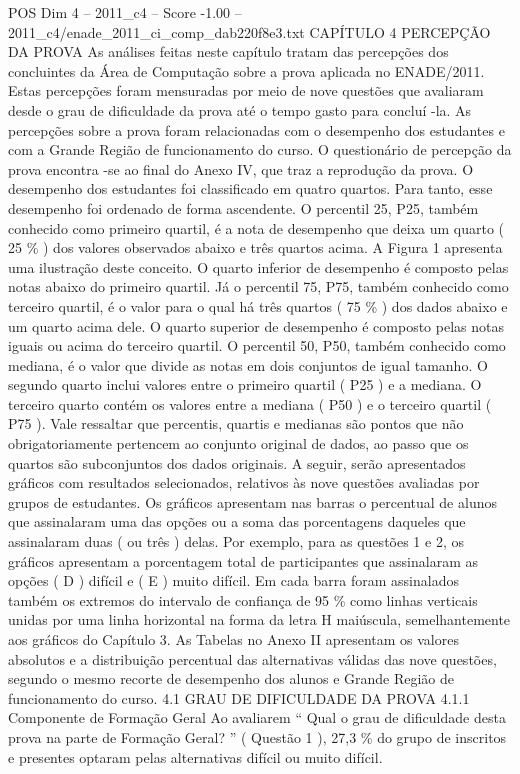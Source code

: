 \begin{textsample}{POS Dim 4 – 2011\_c4 – Score -1.00 – 2011\_c4/enade\_2011\_ci\_comp\_dab220f8e3.txt}  \label{ex:f4_pos_237}
CAPÍTULO 4 PERCEPÇÃO DA PROVA As análises feitas neste capítulo tratam das percepções dos concluintes da Área de Computação sobre a prova aplicada no ENADE/2011.
Estas percepções foram mensuradas por meio de nove questões que avaliaram desde o grau de dificuldade da prova até o tempo gasto para concluí -la.
As percepções sobre a prova foram relacionadas com o desempenho dos estudantes e com a Grande Região de funcionamento do curso.
O questionário de percepção da prova encontra -se ao final do Anexo IV, que traz a reprodução da prova.
O desempenho dos estudantes foi classificado em quatro quartos.
Para tanto, esse desempenho foi ordenado de forma ascendente.
O percentil 25, P25, também conhecido como primeiro quartil, é a nota de desempenho que deixa um quarto ( 25 \% ) dos valores observados abaixo e três quartos acima.
A Figura 1 apresenta uma ilustração deste conceito.
O quarto inferior de desempenho é composto pelas notas abaixo do primeiro quartil.
Já o percentil 75, P75, também conhecido como terceiro quartil, é o valor para o qual há três quartos ( 75 \% ) dos dados abaixo e um quarto acima dele.
O quarto superior de desempenho é composto pelas notas iguais ou acima do terceiro quartil.
O percentil 50, P50, também conhecido como mediana, é o valor que divide as notas em dois conjuntos de igual tamanho.
O segundo quarto inclui valores entre o primeiro quartil ( P25 ) e a mediana.
O terceiro quarto contém os valores entre a mediana ( P50 ) e o terceiro quartil ( P75 ).
Vale ressaltar que percentis, quartis e medianas são pontos que não obrigatoriamente pertencem ao conjunto original de dados, ao passo que os quartos são subconjuntos dos dados originais.
A seguir, serão apresentados gráficos com resultados selecionados, relativos às nove questões avaliadas por grupos de estudantes.
Os gráficos apresentam nas barras o percentual de alunos que assinalaram uma das opções ou a soma das porcentagens daqueles que assinalaram duas ( ou três ) delas.
Por exemplo, para as questões 1 e 2, os gráficos apresentam a porcentagem total de participantes que assinalaram as opções ( D ) difícil e ( E ) muito difícil.
Em cada barra foram assinalados também os extremos do intervalo de confiança de 95 \% como linhas verticais unidas por uma linha horizontal na forma da letra H maiúscula, semelhantemente aos gráficos do Capítulo 3.
As Tabelas no Anexo II apresentam os valores absolutos e a distribuição percentual das alternativas válidas das nove questões, segundo o mesmo recorte de desempenho dos alunos e Grande Região de funcionamento do curso. 4.1 GRAU DE DIFICULDADE DA PROVA 4.1.1 Componente de Formação Geral Ao avaliarem “ Qual o grau de dificuldade desta prova na parte de Formação Geral? ” ( Questão 1 ), 27,3 \% do grupo de inscritos e presentes optaram pelas alternativas difícil ou muito difícil.

\end{textsample}
